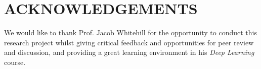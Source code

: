 \documentclass[twocolumn,showpacs,%
  nofootinbib,aps,superscriptaddress,%
  eqsecnum,prd,notitlepage,showkeys,10pt]{revtex4-1}
\begin{document}
\section*{ACKNOWLEDGEMENTS}

\hspace{\parindent} We would like to thank Prof. Jacob Whitehill for the opportunity to conduct this research project whilst giving critical feedback and opportunities for peer review  and discussion, and providing a great learning environment in his \textit{Deep Learning} course.




\end{document}
